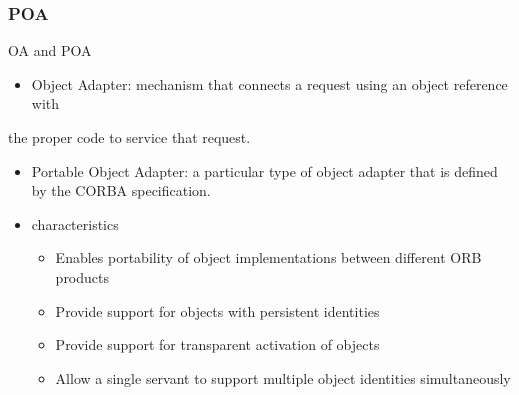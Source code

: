 \documentclass[bigger,hyperref={colorlinks=true, urlcolor=red, plainpages=false, pdfpagelabels, bookmarksnumbered}]{beamer}
\begin{document}
\begin{frame}
\frametitle{POA}
\label{sec-4-8}
\begin{block}{OA and POA}
\label{sec-4-8-1}

\begin{itemize}
\item Object Adapter: mechanism that connects a request using an object reference with
\end{itemize}
the proper code to service that request. 

\begin{itemize}
\item Portable Object Adapter: a particular type of object adapter that is 
  defined by the CORBA specification.
\end{itemize}
\end{block}
\begin{itemize}

\item characteristics
\label{sec-4-8-2}%
\begin{itemize}
\item Enables portability of object implementations between different ORB products
\item Provide support for objects with persistent identities
\item Provide support for transparent activation of objects
\item Allow a single servant to support multiple object identities simultaneously
\end{itemize}


\end{itemize} %
\end{frame}
\end{document}

